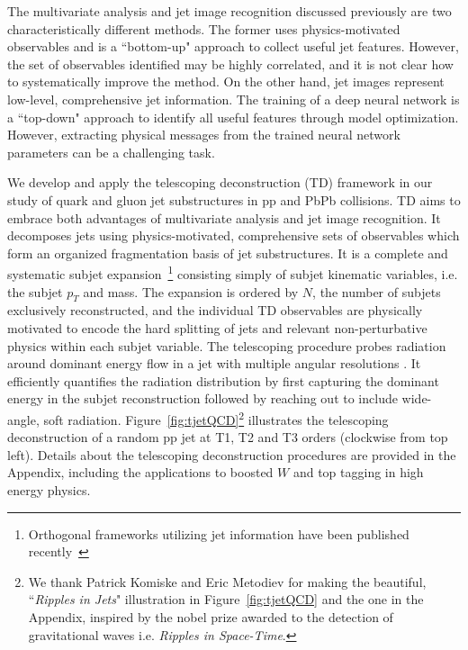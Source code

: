 \documentclass[notoc,preprintnumbers]{JHEP3}
\begin{document}
The multivariate analysis and jet image recognition discussed previously are two characteristically different methods. The former uses physics-motivated observables and is a ``bottom-up" approach to collect useful jet features. However, the set of observables identified may be highly correlated, and it is not clear how to systematically improve the method. On the other hand, jet images represent low-level, comprehensive jet information. The training of a deep neural network is a ``top-down" approach to identify all useful features through model optimization. However, extracting physical messages from the trained neural network parameters can be a challenging task.

We develop and apply the telescoping deconstruction (TD) framework in our study of quark and gluon jet substructures in pp and PbPb collisions. TD aims to embrace both advantages of multivariate analysis and jet image recognition. It decomposes jets using physics-motivated, comprehensive sets of observables which form an organized fragmentation basis of jet substructures. It is a complete and systematic subjet expansion~\footnote{Orthogonal frameworks utilizing jet information have been published recently~\cite{Datta:2017rhs, Komiske:2017aww}} consisting simply of subjet kinematic variables, i.e. the subjet $p_T$ and mass. The expansion is ordered by $N$, the number of subjets exclusively reconstructed, and the individual TD observables are physically motivated to encode the hard splitting of jets and relevant non-perturbative physics within each subjet variable. The telescoping procedure probes radiation around dominant energy flow in a jet with multiple angular resolutions \cite{Chien:2013kca,Adams:2015hiv,Chien:2014hla,Chien:2017xrb}. It efficiently quantifies the radiation distribution by first capturing the dominant energy in the subjet reconstruction followed by reaching out to include wide-angle, soft radiation. Figure~\ref{fig:tjetQCD}\footnote{We thank Patrick Komiske and Eric Metodiev for making the beautiful, ``{\sl Ripples in Jets}" illustration in Figure~\ref{fig:tjetQCD} and the one in the Appendix, inspired by the nobel prize awarded to the detection of gravitational waves i.e. {\sl Ripples in Space-Time}.} illustrates the telescoping deconstruction of a random pp jet at T1, T2 and T3 orders (clockwise from top left). Details about the telescoping deconstruction procedures are provided in the Appendix, including the applications to boosted $W$ and top tagging in high energy physics.
\end{document}
